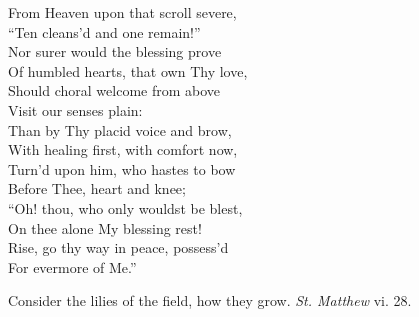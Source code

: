  From Heaven upon that scroll severe, \\
 “Ten cleans’d and one remain!” \\
 Nor surer would the blessing prove \\
 Of humbled hearts, that own Thy love, \\
 Should choral welcome from above \\
 Visit our senses plain: \\
  Than by Thy placid voice and brow, \\
 With healing first, with comfort now, \\
 Turn’d upon him, who hastes to bow \\
 Before Thee, heart and knee; \\
 “Oh! thou, who only wouldst be blest, \\
 On thee alone My blessing rest! \\
 Rise, go thy way in peace, possess’d \\
 For evermore of Me.”\\


Consider the lilies of the field, how they grow. \emph{St. Matthew} vi. 28.

